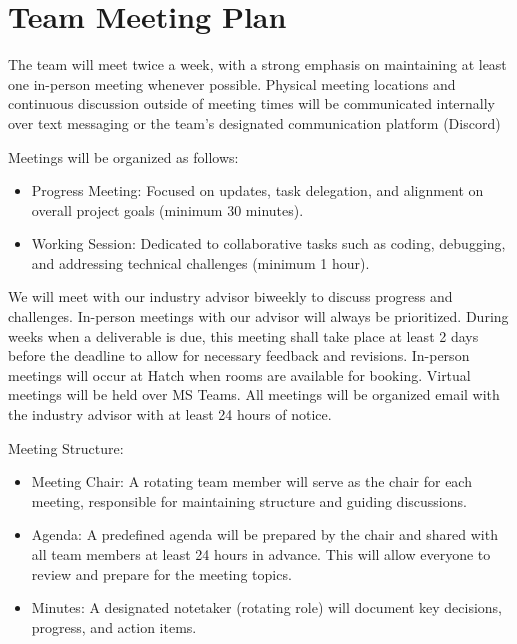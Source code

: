 \documentclass{article}
\begin{document}

\section{Team Meeting Plan}

The team will meet twice a week, with a strong emphasis on maintaining at least one in-person meeting whenever possible. Physical meeting locations and continuous discussion outside of meeting times will be communicated internally over text messaging or the team’s designated communication platform (Discord)\par

Meetings will be organized as follows:

\begin{itemize}
  \item Progress Meeting: Focused on updates, task delegation, and alignment on overall project goals (minimum 30 minutes).
  \item Working Session: Dedicated to collaborative tasks such as coding, debugging, and addressing technical challenges (minimum 1 hour).
\end{itemize}

\begin{flushleft}
  We will meet with our industry advisor biweekly to discuss progress and challenges. In-person meetings with our advisor will always be prioritized. During weeks when a deliverable is due, this meeting shall take place at least 2 days before the deadline to allow for necessary feedback and revisions. 
  In-person meetings will occur at Hatch when rooms are available for booking.
  Virtual meetings will be held over MS Teams. All meetings will be organized email with the industry advisor with at least 24 hours of notice.\par

  Meeting Structure:
\end{flushleft}

\begin{itemize}
  \item Meeting Chair: A rotating team member will serve as the chair for each meeting, responsible for maintaining structure and guiding discussions.
  \item Agenda: A predefined agenda will be prepared by the chair and shared with all team members at least 24 hours in advance. This will allow everyone to review and prepare for the meeting topics.
  \item Minutes: A designated notetaker (rotating role) will document key decisions, progress, and action items.
\end{itemize}
\end{document}
